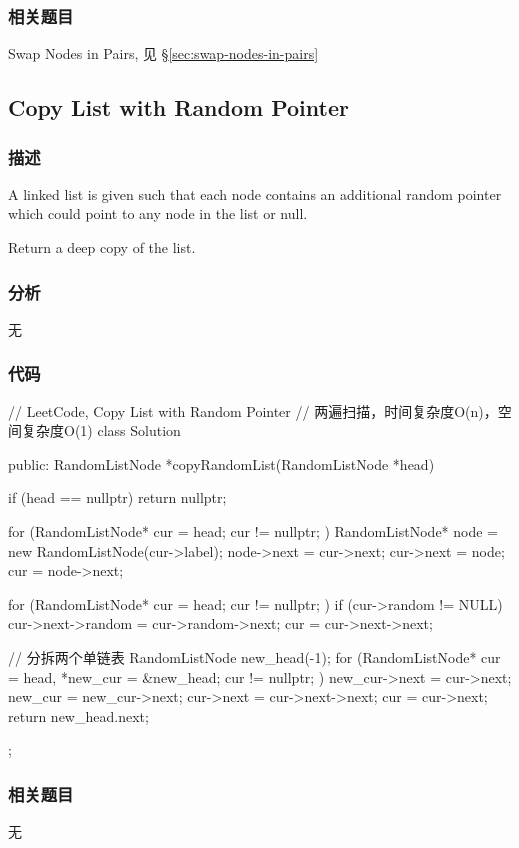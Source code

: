 \subsubsection{相关题目}
\begindot
\item Swap Nodes in Pairs, 见 \S \ref{sec:swap-nodes-in-pairs}
\myenddot


\subsection{Copy List with Random Pointer}
\label{sec:copy-list-with-random-pointer}


\subsubsection{描述}
A linked list is given such that each node contains an additional random pointer which could point to any node in the list or null.

Return a deep copy of the list.


\subsubsection{分析}
无


\subsubsection{代码}
\begin{Code}
// LeetCode, Copy List with Random Pointer
// 两遍扫描，时间复杂度O(n)，空间复杂度O(1)
class Solution {
public:
    RandomListNode *copyRandomList(RandomListNode *head) {
        if (head == nullptr) return nullptr;

        for (RandomListNode* cur = head; cur != nullptr; ) {
            RandomListNode* node = new RandomListNode(cur->label);
            node->next = cur->next;
            cur->next = node;
            cur = node->next;
        }

        for (RandomListNode* cur = head; cur != nullptr; ) {
            if (cur->random != NULL)
                cur->next->random = cur->random->next;
            cur = cur->next->next;
        }

        // 分拆两个单链表
        RandomListNode new_head(-1);
        for (RandomListNode* cur = head, *new_cur = &new_head;
                cur != nullptr; ) {
            new_cur->next = cur->next;
            new_cur = new_cur->next;
            cur->next = cur->next->next;
            cur = cur->next;
        }
        return new_head.next;
    }
};
\end{Code}


\subsubsection{相关题目}
\begindot
\item 无
\myenddot
